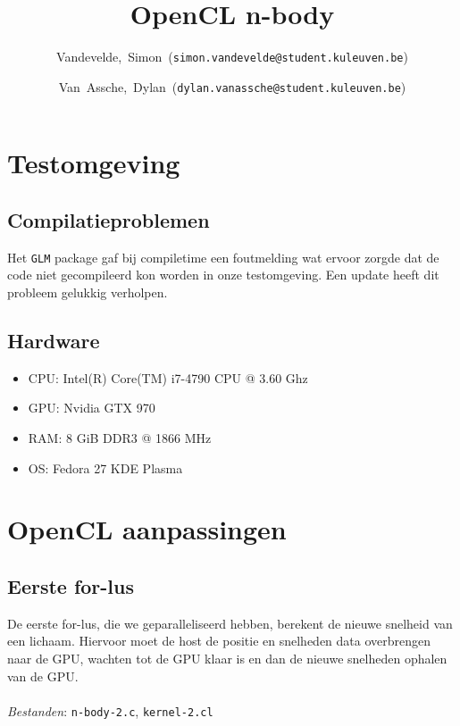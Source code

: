 \documentclass{article}
\title{OpenCL n-body}
\author{Vandevelde,~Simon~(\texttt{simon.vandevelde@student.kuleuven.be})
  \and
  Van~Assche,~Dylan~(\texttt{dylan.vanassche@student.kuleuven.be})}
\begin{document}
\maketitle %

\section{Testomgeving}
\subsection{Compilatieproblemen}

Het \texttt{GLM} package gaf bij compiletime een foutmelding wat
ervoor zorgde dat de code niet gecompileerd kon worden in onze testomgeving.
Een update heeft dit probleem gelukkig verholpen.

\subsection{Hardware}
\begin{itemize}
    \item CPU: Intel(R) Core(TM) i7-4790 CPU @ 3.60 Ghz
    \item GPU: Nvidia GTX 970
    \item RAM: 8 GiB DDR3 @ 1866 MHz
    \item OS: Fedora 27 KDE Plasma
\end{itemize}

\section{OpenCL aanpassingen}
\subsection{Eerste for-lus}
\label{hfd:niet-atomisch-for1}
De eerste for-lus, die we geparalleliseerd hebben, berekent de nieuwe snelheid van een lichaam.
Hiervoor moet de host de positie en snelheden data overbrengen naar de GPU, wachten tot de GPU
klaar is en dan de nieuwe snelheden ophalen van de GPU.
\\
\\
\textit{Bestanden}: \texttt{n-body-2.c}, \texttt{kernel-2.cl}
\end{document}
